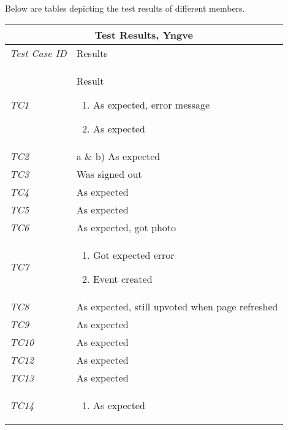 Below are tables depicting the test results of different members. 
%
\begin{minipage}{\linewidth}
\setlength{\tabcolsep}{15pt}
\centering
{}
\begin{tabular}{ |l|p{70mm}| }
	\hline
	\multicolumn{2}{|c|}{\cellcolor{gray!25} \textbf{Test Results, Yngve}} \\
	\hline
	\it{\cellcolor{gray!25}Test Case ID} & {\cellcolor{gray!25} Results } \\
	\hline
	\it{\cellcolor{gray!25}TC1} & Result \begin{enumerate}[label=\alph*)]
	                                       \item As expected, error message
	                                       \item As expected
	                                     \end{enumerate}\\ \hline
	\it{\cellcolor{gray!25}TC2}  & a \& b) As expected \\ \hline
	\it{\cellcolor{gray!25}TC3} & Was signed out \\ \hline
	\it{\cellcolor{gray!25}TC4} & As expected \\ \hline
	\it{\cellcolor{gray!25}TC5} & As expected \\ \hline
	\it{\cellcolor{gray!25}TC6} & As expected, got photo \\ \hline
	\it{\cellcolor{gray!25}TC7} & \begin{enumerate}[label=\alph*)]
	                                \item Got expected error
	                                \item Event created
                                  \end{enumerate}\\ \hline
	\it{\cellcolor{gray!25}TC8} & As expected, still upvoted when page refreshed \\ \hline
	\it{\cellcolor{gray!25}TC9} & As expected \\ \hline
	\it{\cellcolor{gray!25}TC10} & As expected \\ \hline
	\it{\cellcolor{gray!25}TC12} & As expected \\ \hline
	\it{\cellcolor{gray!25}TC13} & As expected \\ \hline
	\it{\cellcolor{gray!25}TC14} & \begin{enumerate}[label=\alph*)]
	                                 \item As expected

\end{enumerate}
\end{tabular}
\end{minipage}
